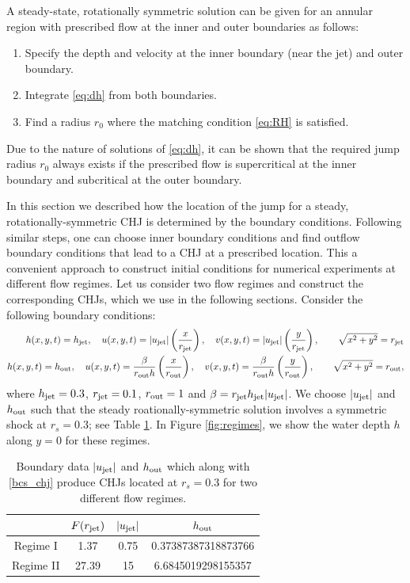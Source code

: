 \documentclass[preprint, 11pt]{article}
\newcommand{\out}{\textup{out}}
\newcommand{\jet}{{\textup{jet}}}
\newcommand{\bfu}{{u}}
\begin{document}
A steady-state, rotationally symmetric solution can be given for an annular region with prescribed
flow at the inner and outer boundaries as follows:
\begin{enumerate}
    \item Specify the depth and velocity at the inner boundary (near the jet) and outer boundary.
    \item Integrate \eqref{eq:dh} from both boundaries.
    \item Find a radius $r_0$ where the matching condition \eqref{eq:RH} is satisfied.
\end{enumerate}
Due to the nature of solutions of \eqref{eq:dh}, it can be shown that the required jump
radius $r_0$ always exists if the prescribed flow is supercritical at the inner boundary
and subcritical at the outer boundary.


In this section we described how the location of the jump for a steady, rotationally-symmetric CHJ
is determined by the boundary conditions. Following similar steps, one can choose inner boundary conditions
and find outflow boundary conditions that lead to a CHJ at a prescribed location.
This a convenient approach to construct initial conditions for numerical experiments at different flow regimes. 
Let us consider two flow regimes and construct the corresponding CHJs, which we use in the following sections.
Consider the following boundary conditions:
\begin{subequations}\label{bcs_chj}
  \begin{align}
  h(x,y,t)=h_\jet, \quad
  u(x,y,t)=|\bfu_\jet| \left(\frac{x}{r_\jet}\right), \quad
  v(x,y,t)=|\bfu_\jet| \left(\frac{y}{r_\jet}\right), \qquad \sqrt{x^2+y^2}=r_\jet \\
  h(x,y,t)=h_\out, \quad 
  u(x,y,t)= \frac{\beta }{r_\out h}\left(\frac{x}{r_\out}\right), \quad
  v(x,y,t)= \frac{\beta }{r_\out h}\left(\frac{y}{r_\out}\right), \qquad \sqrt{x^2+y^2}=r_\out,
  \end{align}
\end{subequations}
where $h_\jet=0.3$, $r_\jet=0.1$, $r_\out=1$ and $\beta=r_\jet h_\jet|\bfu_\jet|$.
We choose $|\bfu_\jet|$ and $h_\out$ such that the steady roationally-symmetric
solution involves a symmetric shock at $r_s=0.3$; see Table \ref{table:regimes}.
In Figure \ref{fig:regimes}, we show the water depth $h$ along $y=0$ for these regimes.

\begin{table}[!ht]
  \begin{center}
    \begin{tabular}{||c||c|c|c||} \hline
      & $F(r_\jet)$ &  $|\bfu_\jet|$ & $h_\out$ \\ \hline
      Regime I & 1.37 & 0.75 & 0.37387387318873766 \\ \hline
      Regime II & 27.39 & 15 & 6.6845019298155357 \\ \hline
    \end{tabular}
    \caption{Boundary data $|u_\jet|$ and $h_\out$ which along with \eqref{bcs_chj}
      produce CHJs located at $r_s=0.3$ for two different flow regimes. \label{table:regimes}}
  \end{center}
\end{table}
\end{document}
